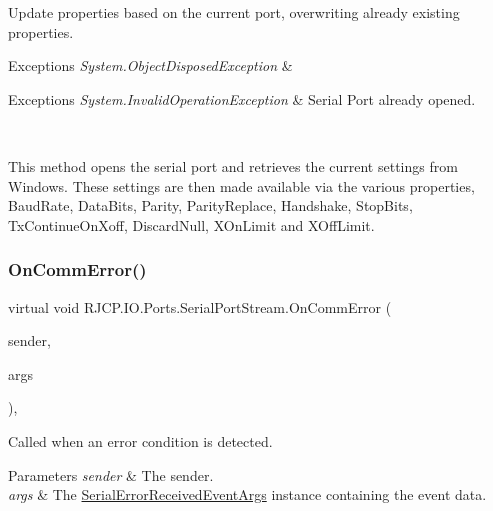 Update properties based on the current port, overwriting already existing properties. 


\begin{DoxyExceptions}{Exceptions}
{\em System.\+Object\+Disposed\+Exception} & 
\begin{DoxyExceptions}{Exceptions}
{\em System.\+Invalid\+Operation\+Exception} & Serial Port already opened.\\
\hline
\end{DoxyExceptions}
\\
\hline
\end{DoxyExceptions}
This method opens the serial port and retrieves the current settings from Windows. These settings are then made available via the various properties, Baud\+Rate, Data\+Bits, Parity, Parity\+Replace, Handshake, Stop\+Bits, Tx\+Continue\+On\+Xoff, Discard\+Null, X\+On\+Limit and X\+Off\+Limit. \mbox{\label{class_r_j_c_p_1_1_i_o_1_1_ports_1_1_serial_port_stream_a56904d54d700793f5df8c9a790ee4c5b}} 
\subsubsection{\texorpdfstring{OnCommError()}{OnCommError()}}
{\footnotesize\ttfamily virtual void R\+J\+C\+P.\+I\+O.\+Ports.\+Serial\+Port\+Stream.\+On\+Comm\+Error (\begin{DoxyParamCaption}\item[{object}]{sender,  }\item[{\mbox{\hyperlink{class_r_j_c_p_1_1_i_o_1_1_ports_1_1_serial_error_received_event_args}{Serial\+Error\+Received\+Event\+Args}}}]{args }\end{DoxyParamCaption})\hspace{0.3cm}{\ttfamily [protected]}, {\ttfamily [virtual]}}



Called when an error condition is detected. 


\begin{DoxyParams}{Parameters}
{\em sender} & The sender.\\
\hline
{\em args} & The \mbox{\hyperlink{class_r_j_c_p_1_1_i_o_1_1_ports_1_1_serial_error_received_event_args}{Serial\+Error\+Received\+Event\+Args}} instance containing the event data.\\
\hline
\end{DoxyParams}
\mbox{\label{class_r_j_c_p_1_1_i_o_1_1_ports_1_1_serial_port_stream_af3431a83388a99e3e9098628be9a93a2}} 
